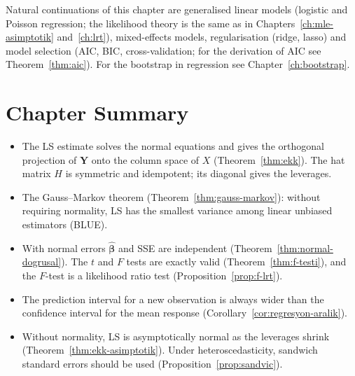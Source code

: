 \documentclass[main.tex]{subfiles}
\begin{document}
\begin{remark}
Natural continuations of this chapter are generalised linear models (logistic and Poisson regression; the likelihood theory is the same as in Chapters~\ref{ch:mle-asimptotik} and~\ref{ch:lrt}), mixed-effects models, regularisation (ridge, lasso) and model selection (AIC, BIC, cross-validation; for the derivation of AIC see Theorem~\ref{thm:aic}). For the bootstrap in regression see Chapter~\ref{ch:bootstrap}.
\end{remark}

\section{Chapter Summary}
\begin{summary}
\begin{itemize}
  \item The LS estimate solves the normal equations and gives the orthogonal projection of $\mathbf Y$ onto the column space of $X$ (Theorem~\ref{thm:ekk}). The hat matrix $H$ is symmetric and idempotent; its diagonal gives the leverages.
  \item The Gauss--Markov theorem (Theorem~\ref{thm:gauss-markov}): without requiring normality, LS has the smallest variance among linear unbiased estimators (BLUE).
  \item With normal errors $\hat{\bm\beta}$ and SSE are independent (Theorem~\ref{thm:normal-dogrusal}). The $t$ and $F$ tests are exactly valid (Theorem~\ref{thm:f-testi}), and the $F$-test is a likelihood ratio test (Proposition~\ref{prop:f-lrt}).
  \item The prediction interval for a new observation is always wider than the confidence interval for the mean response (Corollary~\ref{cor:regresyon-aralik}).
  \item Without normality, LS is asymptotically normal as the leverages shrink (Theorem~\ref{thm:ekk-asimptotik}). Under heteroscedasticity, sandwich standard errors should be used (Proposition~\ref{prop:sandvic}).
\end{itemize}
\end{summary}
\end{document}

